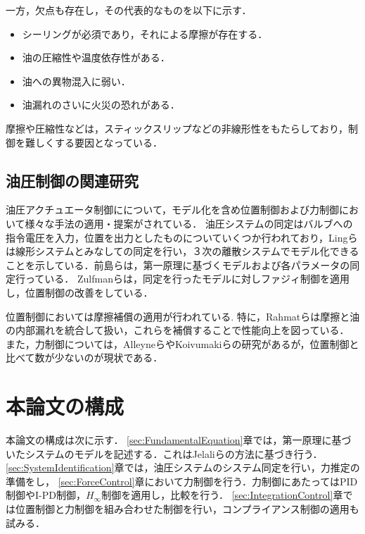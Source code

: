 一方，欠点も存在し，その代表的なものを以下に示す．
\begin{itemize}
    \item シーリングが必須であり，それによる摩擦が存在する．
    \item 油の圧縮性や温度依存性がある．
    \item 油への異物混入に弱い．
    \item 油漏れのさいに火災の恐れがある．
\end{itemize}
摩擦や圧縮性などは，スティックスリップなどの非線形性をもたらしており，制御を難しくする要因となっている\cite{松崎淳1962直動形油圧駆動機構におけるスティックスリップ,de1995new}．


\subsection{油圧制御の関連研究}
油圧アクチュエータ制御にについて，モデル化を含め位置制御および力制御において様々な手法の適用・提案がされている．
油圧システムの同定はバルブへの指令電圧を入力，位置を出力としたものについていくつか行われており，Lingらは線形システムとみなしての同定を行い，３次の離散システムでモデル化できることを示している\cite{ling2012system}．前島らは，第一原理に基づくモデルおよび各パラメータの同定\cite{前島祐三2011,前島祐三2014}行っている．
Zulfmanらは，同定を行ったモデルに対しファジィ制御を適用し，位置制御の改善をしている\cite{zheng2009application}．

位置制御においては摩擦補償の適用が行われている\cite{jianyong2012robust,rahmat2011modeling,lischinsky1999friction}.
特に，Rahmatらは摩擦と油の内部漏れを統合して扱い，これらを補償することで性能向上を図っている\cite{rahmat2011modeling}．
また，力制御については，AlleyneらやKoivumakiらの研究があるが，位置制御と比べて数が少ないのが現状である\cite{Alleyne,koivumaki2015stability}．



\section{本論文の構成}
本論文の構成は次に示す．
\ref{sec:FundamentalEquation}章では，第一原理に基づいたシステムのモデルを記述する．これはJelaliらの方法\cite{jelali2012hydraulic}に基づき行う．
\ref{sec:SystemIdentification}章では，油圧システムのシステム同定を行い，力推定の準備をし，
\ref{sec:ForceControl}章において力制御を行う．力制御にあたってはPID制御やI-PD制御，$H_\infty$制御を適用し，比較を行う．
\ref{sec:IntegrationControl}章では位置制御と力制御を組み合わせた制御を行い，コンプライアンス制御の適用も試みる．
